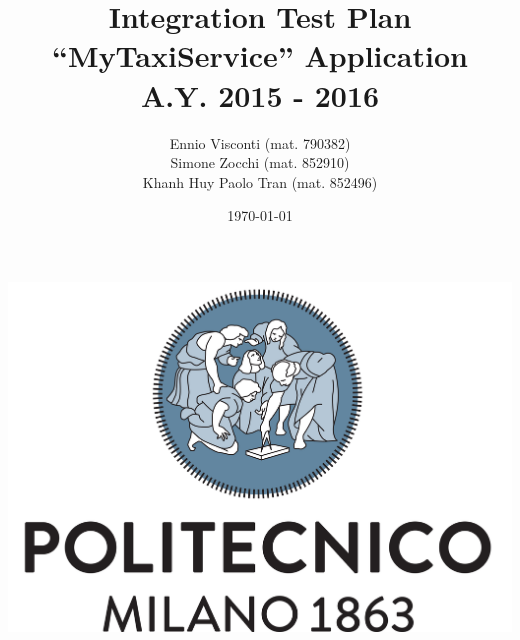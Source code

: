 \documentclass{article}
\title{ Integration Test Plan  
\\ ``MyTaxiService'' Application
\\ A.Y. 2015 - 2016 }
\author{Ennio Visconti (mat. 790382)
\\ Simone Zocchi (mat. 852910)
\\ Khanh Huy Paolo Tran (mat. 852496)}
\date{\today}
\begin{document}
   
    \begin{titlepage}
        \maketitle 
        \vfill
        \centerline{\includegraphics[scale=0.5]{LogoPolimi}}
        \vfill
        \vfill
    \end{titlepage}

        
    \tableofcontents










\end{document}
